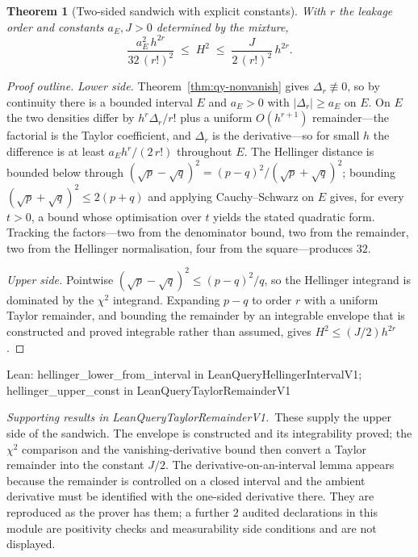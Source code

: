\documentclass[conference]{IEEEtran}
\newtheorem{theorem}{Theorem}
\theoremstyle{definition}
\newcommand{\lean}[1]{\textsf{\footnotesize #1}}
\newcommand{\leanbox}[1]{%
  \par\vspace{2pt}\noindent
  {\footnotesize\textsf{Lean: #1}}\par\vspace{2pt}}
\begin{document}
\begin{theorem}[Two-sided sandwich with explicit constants]
\label{thm:qy-sandwich}
With $r$ the leakage order and constants $a_{E},J>0$ determined by the mixture,
\begin{equation}
\frac{a_{E}^{2}\,h^{2r}}{32\,(r!)^{2}}\;\leq\;H^{2}\;\leq\;\frac{J}{2\,(r!)^{2}}\,h^{2r}.
\label{eq:qy-sandwich}
\end{equation}
\end{theorem}

\begin{proof}[Proof outline]
\emph{Lower side.} Theorem~\ref{thm:qy-nonvanish} gives $\Delta_{r}\not\equiv0$, so by
continuity there is a bounded interval $E$ and $a_{E}>0$ with $|\Delta_{r}|\ge a_{E}$ on
$E$. On $E$ the two densities differ by $h^{r}\Delta_{r}/r!$ plus a uniform $O(h^{r+1})$
remainder---the factorial is the Taylor coefficient, and $\Delta_{r}$ is the derivative---so
for small $h$ the difference is at least $a_{E}h^{r}/(2\,r!)$ throughout $E$. The
Hellinger distance is bounded below through
$(\sqrt{p}-\sqrt{q})^{2}=(p-q)^{2}/(\sqrt{p}+\sqrt{q})^{2}$; bounding
$(\sqrt{p}+\sqrt{q})^{2}\le2(p+q)$ and applying Cauchy--Schwarz on $E$ gives, for every
$t>0$, a bound whose optimisation over $t$ yields the stated quadratic form. Tracking the
factors---two from the denominator bound, two from the remainder, two from the Hellinger
normalisation, four from the square---produces $32$.

\emph{Upper side.} Pointwise $(\sqrt{p}-\sqrt{q})^{2}\le(p-q)^{2}/q$, so the Hellinger
integrand is dominated by the $\chi^{2}$ integrand. Expanding $p-q$ to order $r$ with a
uniform Taylor remainder, and bounding the remainder by an integrable envelope that is
constructed and proved integrable rather than assumed, gives $H^{2}\le(J/2)h^{2r}$.
\end{proof}

\leanbox{\lean{hellinger\_lower\_from\_interval} in \lean{LeanQueryHellingerIntervalV1};
\lean{hellinger\_upper\_const} in \lean{LeanQueryTaylorRemainderV1}}

\noindent\emph{Supporting results in \lean{LeanQueryTaylorRemainderV1}.}~These supply the upper side of the sandwich. The envelope is constructed and its integrability proved; the $\chi^{2}$ comparison and the vanishing-derivative bound then convert a Taylor remainder into the constant $J/2$. The derivative-on-an-interval lemma appears because the remainder is controlled on a closed interval and the ambient derivative must be identified with the one-sided derivative there. They are reproduced as the prover has them; a further $2$ audited declarations in this module are positivity checks and measurability side conditions and are not displayed.
\end{document}
